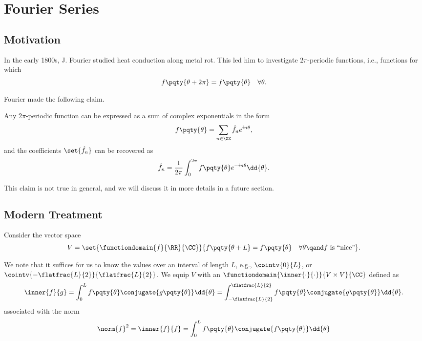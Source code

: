\section{Fourier Series}
\subsection{Motivation}

In the early 1800s, J. Fourier studied heat conduction along metal rot. This led him to investigate \(2 \pi\)-periodic functions, i.e., functions for which
\begin{equation}
    f\pqty{\theta + 2\pi} = f\pqty{\theta} \quad \forall \theta.
\end{equation}

Fourier made the following claim.

\begin{claim}
    Any \(2 \pi\)-periodic function can be expressed as a sum of complex exponentials in the form
    \begin{equation}
        f\pqty{\theta} = \sum_{n \in \ZZ} \hat{f}_n e^{i n \theta},
    \end{equation}
    and the coefficients \(\set{\hat{f}_n}\) can be recovered as
    \begin{equation}
        \label{eq:fourier-claim-coefficient}%
        \hat{f}_n = \frac{1}{2\pi} \int_{0}^{2 \pi} f\pqty{\theta} e^{-i n \theta} \dd{\theta}.        
    \end{equation}
\end{claim}

This claim is not true in general, and we will discuss it in more details in a future section.

\subsection{Modern Treatment}

Consider the vector space
\begin{equation}
    V = \set{\functiondomain{f}{\RR}{\CC}}{
        f\pqty{\theta + L} = f\pqty{\theta} \quad \forall \theta \qand f \text{ is ``nice''}
    }.
\end{equation}

We note that it suffices for us to know the values over an interval of length \(L\), e.g., \(\cointv{0}{L}\), or \(\cointv{-\flatfrac{L}{2}}{\flatfrac{L}{2}}\). We equip \(V\) with an  \(\functiondomain{\inner   {\cdot}{\cdot}}{V \times V}{\CC}\) defined as
\begin{equation}
    \inner{f}{g} = \int_{0}^{L} f\pqty{\theta} \conjugate{g\pqty{\theta}} \dd{\theta}  = \int_{- \flatfrac{L}{2}}^{\flatfrac{L}{2}} f\pqty{\theta} \conjugate{g\pqty{\theta}} \dd{\theta}.
\end{equation}
associated with the norm
\begin{equation}
    \norm{f}^2 = \inner{f}{f} = \int_{0}^{L} f\pqty{\theta} \conjugate{f\pqty{\theta}} \dd{\theta}
\end{equation}

